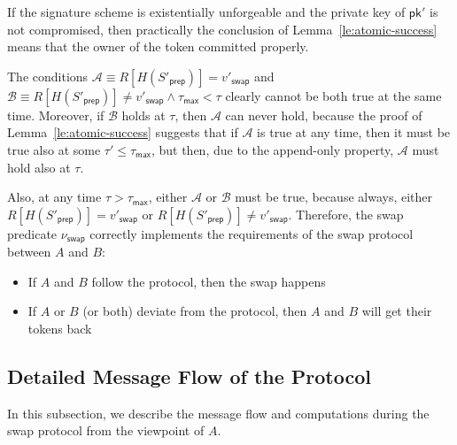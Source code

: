 \documentclass{article}
\newcommand{\pubkey}[0]{\mathsf{pk}}
\begin{document}
\noindent If the signature scheme is existentially unforgeable and the private key of $\pubkey'$ is not compromised, then practically the conclusion of Lemma~\ref{le:atomic-success} means that the owner of the token committed properly.

The conditions $\mathcal{A}\equiv R[H(S'_\mathsf{prep})]=v'_\mathsf{swap}$
and $\mathcal{B}\equiv R[H(S'_\mathsf{prep})]\neq v'_\mathsf{swap}\wedge \tau_\mathsf{max}<\tau$ clearly cannot be both true at the same time. Moreover, if $\mathcal{B}$ holds at $\tau$, then $\mathcal{A}$ can never hold, because the proof of Lemma~\ref{le:atomic-success} suggests that if $\mathcal{A}$ is true at any time, then it must be true
also at some $\tau'\le \tau_\mathsf{max}$, but then, due to the append-only property, $\mathcal{A}$ must hold also at $\tau$.

Also, at any time $\tau>\tau_\mathsf{max}$, either $\mathcal{A}$ or $\mathcal{B}$ must be true, because always, either $R[H(S'_\mathsf{prep})]=v'_\mathsf{swap}$
or $R[H(S'_\mathsf{prep})]\neq v'_\mathsf{swap}$. Therefore, the swap predicate $\nu_\mathsf{swap}$ correctly implements the requirements of the swap protocol between $A$ and $B$:
\begin{itemize}
\item[1.] If $A$ and $B$ follow the protocol, then the swap happens
\item[2.] If $A$ or $B$ (or both) deviate from the protocol, then $A$ and $B$ will get their tokens back
\end{itemize}

\subsection{Detailed Message Flow of the Protocol}

In this subsection, we describe the message flow and computations during the swap protocol from the viewpoint of $A$.
\medskip
\end{document}

